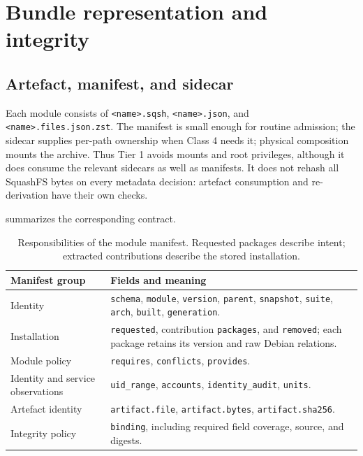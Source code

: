 \section{Bundle representation and integrity}
\label{sec:arch:bundle}

\subsection{Artefact, manifest, and sidecar}
\label{sec:arch:data}

Each module consists of \texttt{<name>.sqsh}, \texttt{<name>.json}, and \texttt{<name>.files.json.zst}. The manifest is small enough for routine admission; the sidecar supplies per-path ownership when Class \num{4} needs it; physical composition mounts the archive. Thus Tier \num{1} avoids mounts and root privileges, although it does consume the relevant sidecars as well as manifests. It does not rehash all SquashFS bytes on every metadata decision: artefact consumption and re-derivation have their own checks.

 summarizes the corresponding contract.
\begin{table}[tbp]
\centering\small
\begin{tabularx}{\textwidth}{@{}p{2.6cm}Y@{}}
\toprule
Manifest group & Fields and meaning \\
\midrule
Identity & \texttt{schema}, \texttt{module}, \texttt{version}, \texttt{parent}, \texttt{snapshot}, \texttt{suite}, \texttt{arch}, \texttt{built}, \texttt{generation}. \\
Installation & \texttt{requested}, contribution \texttt{packages}, and \texttt{removed}; each package retains its version and raw Debian relations. \\
Module policy & \texttt{requires}, \texttt{conflicts}, \texttt{provides}. \\
Identity and service observations & \texttt{uid\_range}, \texttt{accounts}, \texttt{identity\_audit}, \texttt{units}. \\
Artefact identity & \texttt{artifact.file}, \texttt{artifact.bytes}, \texttt{artifact.sha256}. \\
Integrity policy & \texttt{binding}, including required field coverage, source, and digests. \\
\bottomrule
\end{tabularx}
\caption{Responsibilities of the module manifest. Requested packages describe intent; extracted contributions describe the stored installation.}
\label{tab:manifest}
\end{table}


